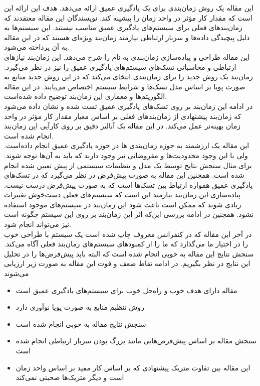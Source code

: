 \documentclass[a4paper, 12pt]{article}
\title{\lr{Pollux: Co-adaptive Cluster Scheduling
for Goodput-Optimized Deep Learning paper}}
\author{حسین افکار}
\begin{document}
\maketitle
این مقاله یک روش زمان‌بندی برای یک
یادگیری عمیق ارائه می‌دهد. هدف این ارائه این است که مقدار کار مؤثر در واحد زمان را بیشینه
کند. نویسندگان این مقاله معتقدند که زمان‌بند‌های فعلی برای سیستم‌های یادگیری عمیق مناسب نیستند.
این سیستم‌ها به دلیل پیچیدگی داده‌ها و سربار ارتباطی نیازمند زمان‌بند ویژه‌ای هستند که در این مقاله
به آن پرداخته می‌شود. \\
این مقاله طراحی و پیاده‌سازی زمان‌بندی به نام
را شرح می‌دهد.
این زمان‌بند نیاز‌های ارتباطی و محاسباتی تسک‌های سیستم‌های یادگیری عمیق را نیز در نظر می‌گیرد.
زمان‌بند
یک روش جدید را برای زمان‌بندی انتخای می‌کند که در این روش جدید منابع به صورت پویا بر اساس
مدل تسک‌ها و شرایط سیستم اختصاص می‌یابند.
در این مقاله الگوریتم‌ها و معماری این زمان‌بند توضیح داده شده‌است. \\
در ادامه این زمان‌بند بر روی تسک‌های یادگیری عمیق تست شده و نشان داده می‌شود
که زمان‌بند پیشنهادی از زمان‌بند‌های فعلی بر اساس معیار مقدار کار مؤثر در واحد زمان
بهینه‌تر عمل می‌کند. در این مقاله یک آنالیز دقیق بر روی کارآیی این زمان‌بند انجام شده است. \\
این مقاله یک
ارزشمند به حوزه زمان‌بندی
ها در حوزه یادگیری عمیق انجام داده‌است.
ولی با این وجود محدودیت‌ها و مفروضاتی نیز وجود دارند که باید به آن‌ها توجه شوند.
برای مثال سنجش نتایج توسط یک مدل
و تنظیمات سیستمی از پیش تعیین شده انجام شده است.
همچنین این مقاله به صورت پیش‌فرض در نظر می‌گیرد که در تسک‌های یادگیری عمیق همواره
ارتباط بین تسک‌ها
است که به صورت پیش‌فرض درست نیست.
پیاده‌سازی این زمان‌بند نیازمند این است که سیستم‌های فعلی دست‌خوش تغییرات زیادی شوند که ممکن است
باعث شود این زمان‌بند در سیستم‌های موجود استفاده نشود.
همچنین در ادامه بررسی این‌که اثر این زمان‌بند بر روی
این سیستم چگونه است نیز می‌تواند انجام شود. \\
در آخر این مقاله که در کنفرانس معروف
چاپ شده است یک سیستم با طراحی خوب را در اختیار ما می‌گذارد که ما را از کمبود‌های
سیستم‌های زمان‌بند فعلی آگاه می‌کند.
سنجش نتایج این مقاله به خوبی انجام شده است که البته باید پیش‌فرض‌ها را در تحلیل این نتایج
در نظر بگیریم.
در ادامه نقاط ضعف و قوت این مقاله به صورت زیر ارزیابی می‌شوند
\begin{itemize}
    \item مقاله دارای هدف خوب و راه‌حل خوب برای سیستم‌های یادگیری عمیق است
    \item روش تنظیم منابع به صورت پویا نوآوری دارد
    \item سنجش نتایج مقاله به خوبی انجام شده است
    \item سنجش مقاله بر اساس پیش‌فرض‌هایی مانند بزرگ بودن سربار ارتباطی انجام شده است
    \item این مقاله بین تفاوت متریک پیشنهادی که بر اساس کار مفید بر اساس واحد زمان است
    و دیگر متریک‌ها صحبتی نمی‌کند
\end{itemize}


\end{document}
